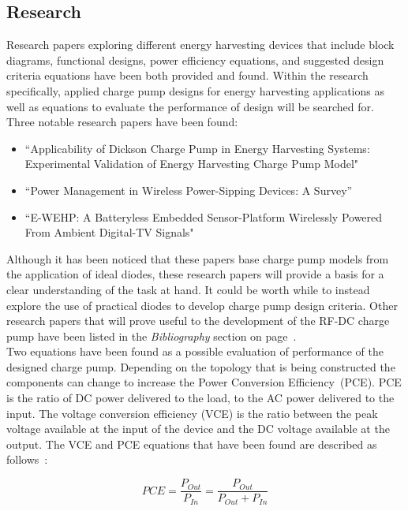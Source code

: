 \documentclass[12pt]{article}
\begin{document}
	\subsection{Research}
	Research papers exploring different energy harvesting devices that include block diagrams, functional designs, power efficiency equations, and suggested design criteria equations have been both provided and found. Within the research specifically, applied charge pump designs for energy harvesting applications as well as equations to evaluate the performance of design will be searched for.\\
	
	\noindent Three notable research papers have been found:
	\begin{itemize}
	\item ``Applicability of Dickson Charge Pump in Energy Harvesting Systems: Experimental Validation of Energy Harvesting Charge Pump Model" \cite{Vinco}
	\item ``Power Management in Wireless Power-Sipping Devices: A Survey” \cite{Guler}
	\item ``E-WEHP: A Batteryless Embedded Sensor-Platform Wirelessly Powered From Ambient Digital-TV Signals" \cite{Vyas}
	\end{itemize} 
	\vspace{0.5em}
	\noindent Although it has been noticed that these papers base charge pump models from the application of ideal diodes, these research papers will provide a basis for a clear understanding of the task at hand. It could be worth while to instead explore the use of practical diodes to develop charge pump design criteria. Other research papers that will prove useful to the development of the RF-DC charge pump have been listed in the \textit{Bibliography} section on page~\pageref{bibliography}.\\
	
	\noindent Two equations have been found as a possible evaluation of performance of the designed charge pump. Depending on the topology that is being constructed the components can change to increase the Power Conversion Efficiency~(PCE). PCE is the ratio of DC power delivered to the load, to the AC power delivered to the input. The voltage conversion efficiency (VCE) is the ratio between the peak voltage available at the input of the device and the DC voltage available at the output. The VCE and PCE equations that have been found are described as follows~\cite{Guler}:

\begin{equation}
PCE = \frac{P_{Out}}{P_{In}} = \frac{P_{Out}}{P_{Out} + P_{In}}\label{eq:PCE}
\end{equation}
\vspace{1em}
\end{document}
